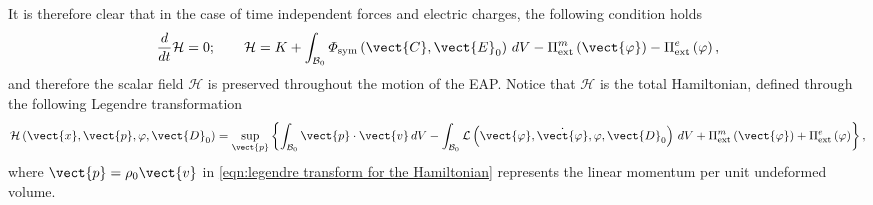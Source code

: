 It is therefore clear that in the case of time independent forces and electric charges, the following condition holds
%
\begin{equation}\label{eqn:conservation 2}
\frac{d}{dt}\mathcal{H} = 0;\qquad
\mathcal{H} = K + \int_{\mathcal{B}_0}\varPhi_{\text{sym}}\left(\vect{C},\vect{E}_0\right)\,dV - \Pi^m_{\text{ext}}\left(\vect{\varphi}\right)
-\Pi^e_{\text{ext}}\left(\varphi\right),
\end{equation}
%
and therefore the scalar field $\mathcal{H}$ is preserved throughout the motion of the EAP. Notice that $\mathcal{H}$ is the total Hamiltonian, defined through the following Legendre transformation
%
\begin{equation}\label{eqn:legendre transform for the Hamiltonian}
\mathcal{H}\left(\vect{x},\vect{p},\varphi,\vect{D}_0\right) = \sup_{\vect{p}}\left\{\int_{\mathcal{B}_0}\vect{p}\cdot\vect{v}\,dV - \int_{\mathcal{B}_0}\mathcal{L}\left(\vect{\varphi},\dot{\vect{\varphi}},\varphi,\vect{D}_0\right)\,dV +  \Pi^m_{\text{ext}}\left(\vect{\varphi}\right) + 
\Pi^e_{\text{ext}}\left(\varphi\right)\right\},
\end{equation}
%
where $\vect{p} = \rho_0\vect{v}$ in \eqref{eqn:legendre transform for the Hamiltonian} represents the linear momentum per unit undeformed volume.

\noindent\makebox[\linewidth]{\rule{\textwidth}{0.4pt}}

